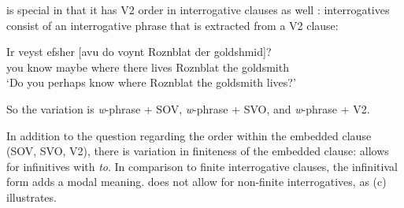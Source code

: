  is special in that it has V2 order in interrogative clauses as well \citep[Sections~4.1, 4.2]{Diesing90a}: interrogatives
consist of an interrogative phrase that is extracted from a V2 clause:

\ea
\gll Ir veyst efsher [avu            do    voynt Roznblat   der goldshmid]?\footnotemark\\
     you know maybe  \spacebr{}where there lives Roznblat the goldsmith\\
\glt `Do you perhaps know where Roznblat the goldsmith lives?' 
\z
%


\noindent
So the variation is \emph{w}-phrase + SOV, \emph{w}-phrase + SVO, and \emph{w}-phrase + V2.\pagebreak

In addition to the question regarding the order within the embedded clause (SOV, SVO, V2), there is
variation in finiteness of the embedded clause:
\eal
\label{ex-what-to-read}
\zl
{} allows for infinitives with \emph{to}. In comparison to finite interrogative clauses, the
infinitival form adds a modal meaning.  does not allow for non-finite interrogatives, as
(c) illustrates.



